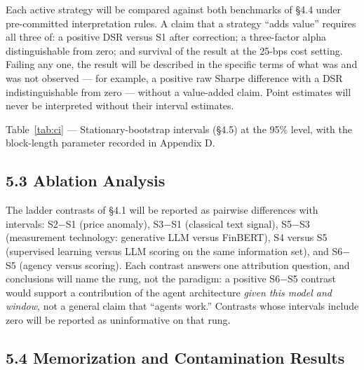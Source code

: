 \documentclass[
  12pt,
]{article}
\begin{document}
Each active strategy will be compared against both benchmarks of §4.4
under pre-committed interpretation rules. A claim that a strategy ``adds
value'' requires all three of: a positive DSR versus S1 after
correction; a three-factor alpha distinguishable from zero; and survival
of the result at the 25-bps cost setting. Failing any one, the result
will be described in the specific terms of what was and was not observed
--- for example, a positive raw Sharpe difference with a DSR
indistinguishable from zero --- without a value-added claim. Point
estimates will never be interpreted without their interval estimates.



\begin{table}[H]
\centering
{}
\caption{Stationary-bootstrap 95\% confidence intervals for Sharpe-ratio differences versus S1 (placeholder; to be populated after experiments).}
\label{tab:ci}
\end{table}

Table~\ref{tab:ci} —
Stationary-bootstrap intervals (§4.5) at the 95\% level, with the
block-length parameter recorded in Appendix D.

\hypertarget{ablation-analysis}{%
\subsection{5.3 Ablation Analysis}\label{ablation-analysis}}

The ladder contrasts of §4.1 will be reported as pairwise differences
with intervals: S2\(-\)S1 (price anomaly), S3\(-\)S1 (classical text
signal), S5\(-\)S3 (measurement technology: generative LLM versus
FinBERT), S4 versus S5 (supervised learning versus LLM scoring on the
same information set), and S6\(-\)S5 (agency versus scoring). Each
contrast answers one attribution question, and conclusions will name the
rung, not the paradigm: a positive S6\(-\)S5 contrast would support a
contribution of the agent architecture \emph{given this model and
window}, not a general claim that ``agents work.'' Contrasts whose
intervals include zero will be reported as uninformative on that rung.

\hypertarget{memorization-and-contamination-results}{%
\subsection{5.4 Memorization and Contamination
Results}\label{memorization-and-contamination-results}}
\end{document}
